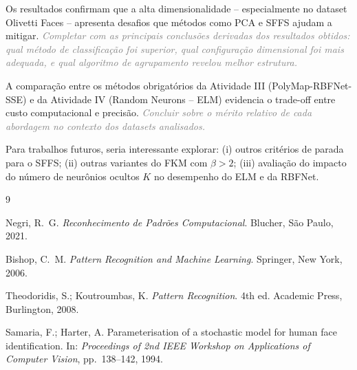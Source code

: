 \documentclass[12pt, a4paper]{article}
\newcommand{\placeholder}[1]{\textcolor{gray}{\textit{#1}}}
\begin{document}
Os resultados confirmam que a alta dimensionalidade -- especialmente no dataset Olivetti Faces -- apresenta desafios que métodos como PCA e SFFS ajudam a mitigar. \placeholder{Completar com as principais conclusões derivadas dos resultados obtidos: qual método de classificação foi superior, qual configuração dimensional foi mais adequada, e qual algoritmo de agrupamento revelou melhor estrutura.}

A comparação entre os métodos obrigatórios da Atividade III (PolyMap-RBFNet-SSE) e da Atividade IV (Random Neurons -- ELM) evidencia o trade-off entre custo computacional e precisão. \placeholder{Concluir sobre o mérito relativo de cada abordagem no contexto dos datasets analisados.}

Para trabalhos futuros, seria interessante explorar: (i) outros critérios de parada para o SFFS; (ii) outras variantes do FKM com $\beta > 2$; (iii) avaliação do impacto do número de neurônios ocultos $K$ no desempenho do ELM e da RBFNet.


\begin{thebibliography}{9}

Negri, R.\ G.
\newblock \textit{Reconhecimento de Padrões Computacional}.
\newblock Blucher, São Paulo, 2021.

Bishop, C.\ M.
\newblock \textit{Pattern Recognition and Machine Learning}.
\newblock Springer, New York, 2006.

Theodoridis, S.; Koutroumbas, K.
\newblock \textit{Pattern Recognition}.
\newblock 4th ed. Academic Press, Burlington, 2008.

Samaria, F.; Harter, A.
\newblock Parameterisation of a stochastic model for human face identification.
\newblock In: \textit{Proceedings of 2nd IEEE Workshop on Applications of Computer Vision}, pp.\ 138--142, 1994.

\end{thebibliography}
\end{document}
